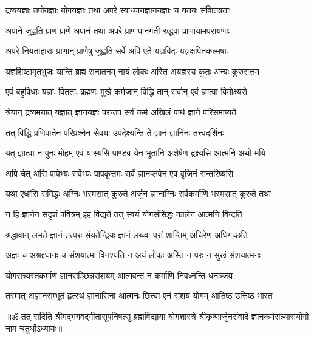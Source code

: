 \twolineshloka
{द्रव्ययज्ञाः तपोयज्ञाः योगयज्ञाः तथा अपरे}
{स्वाध्यायज्ञानयज्ञाः च यतयः संशितव्रताः}%

\twolineshloka
{अपाने जुह्वति प्राणं प्राणे अपानं तथा अपरे}
{प्राणापानगती रुद्ध्वा प्राणायामपरायणाः}%

\twolineshloka
{अपरे नियताहाराः प्राणान् प्राणेषु जुह्वति}
{सर्वे अपि एते यज्ञविदः यज्ञक्षपितकल्मषाः}%

\twolineshloka
{यज्ञशिष्टामृतभुजः यान्ति ब्रह्म सनातनम्}
{नायं लोकः अस्ति अयज्ञस्य कुतः अन्यः कुरुसत्तम}%

\twolineshloka
{एवं बहुविधाः यज्ञाः वितताः ब्रह्मणः मुखे}
{कर्मजान् विद्धि तान् सर्वान् एवं ज्ञात्वा विमोक्ष्यसे}%

\twolineshloka
{श्रेयान् द्रव्यमयात् यज्ञात् ज्ञानयज्ञः परन्तप}
{सर्वं कर्म अखिलं पार्थ ज्ञाने परिसमाप्यते}%

\twolineshloka
{तत् विद्धि प्रणिपातेन परिप्रश्नेन सेवया}
{उपदेक्ष्यन्ति ते ज्ञानं ज्ञानिनः तत्त्वदर्शिनः}%

\twolineshloka
{यत् ज्ञात्वा न पुनः मोहम् एवं यास्यसि पाण्डव}
{येन भूतानि अशेषेण द्रक्ष्यसि आत्मनि अथो मयि}%

\twolineshloka
{अपि चेत् असि पापेभ्यः सर्वेभ्यः पापकृत्तमः}
{सर्वं ज्ञानप्लवेन एव वृजिनं सन्तरिष्यसि}%

\twolineshloka
{यथा एधांसि समिद्धः अग्निः भस्मसात् कुरुते अर्जुन}
{ज्ञानाग्निः सर्वकर्माणि भस्मसात् कुरुते तथा}%

\twolineshloka
{न हि ज्ञानेन सदृशं पवित्रम् इह विद्यते}
{तत् स्वयं योगसंसिद्धः कालेन आत्मनि विन्दति}%

\twolineshloka
{श्रद्धावान् लभते ज्ञानं तत्परः संयतेन्द्रियः}
{ज्ञानं लब्ध्वा परां शान्तिम् अचिरेण अधिगच्छति}%

\twolineshloka
{अज्ञः च अश्रद्दधानः च संशयात्मा विनश्यति}
{न अयं लोकः अस्ति न परः न सुखं संशयात्मनः}%

\twolineshloka
{योगसन्न्यस्तकर्माणं ज्ञानसञ्छिन्नसंशयम्}
{आत्मवन्तं न कर्माणि निबध्नन्ति धनञ्जय}%

\twolineshloka
{तस्मात् अज्ञानसम्भूतं हृत्स्थं ज्ञानासिना आत्मनः}
{छित्त्वा एनं संशयं योगम् आतिष्ठ उत्तिष्ठ भारत}%

{॥ॐ तत् सदिति श्रीमद्भगवद्गीतासूपनिषत्सु ब्रह्मविद्यायां योगशास्त्रे श्रीकृष्णार्जुनसंवादे ज्ञानकर्मसन्न्यासयोगो नाम चतुर्थोऽध्यायः॥}



